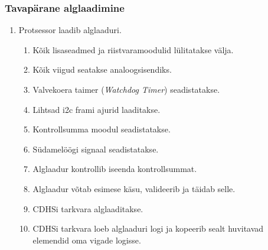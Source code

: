 \documentclass[12pt,a4paper]{article}
\begin{document}
\subsubsection{Tavapärane alglaadimine}
\label{sec:usecase:default}
\begin{enumerate}
	\item Protsessor laadib alglaaduri.
		\begin{enumerate}
			\item Kõik lisaseadmed ja riistvaramoodulid lülitatakse välja.
			\item Kõik viigud seatakse analoogsisendiks.
			\item Valvekoera taimer (\textit{Watchdog Timer}) seadistatakse.
			\item Lihtsad \gls{i2c} \gls{fram}i ajurid laaditakse.
			\item Kontrollsumma moodul seadistatakse.
			\item Südamelöögi signaal seadistatakse.
			\item Alglaadur kontrollib iseenda kontrollsummat.
			\item Alglaadur võtab esimese käsu, valideerib ja täidab selle.
			\item CDHSi tarkvara alglaaditakse.
			\item CDHSi tarkvara loeb alglaaduri logi ja kopeerib sealt 
				huvitavad elemendid oma vigade logisse.
		\end{enumerate}
\end{enumerate}
\end{document}
